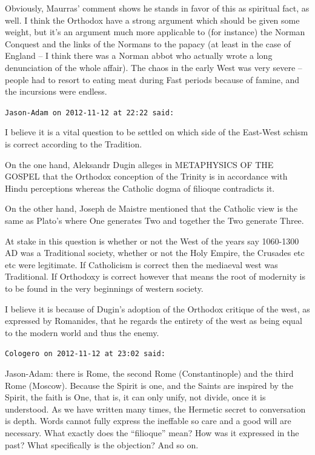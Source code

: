 \begin{footnotesize}
\begin{sffamily}
Obviously, Maurras' comment shows he stands in favor of this as spiritual fact, as well. I think the Orthodox have a strong argument which should be given some weight, but it's an argument much more applicable to (for instance) the Norman Conquest and the links of the Normans to the papacy (at least in the case of England -- I think there was a Norman abbot who actually wrote a long denunciation of the whole affair). The chaos in the early West was very severe -- people had to resort to eating meat during Fast periods because of famine, and the incursions were endless.

\hfill

\texttt{Jason-Adam on 2012-11-12 at 22:22 said:}

I believe it is a vital question to be settled on which side of the East-West schism is correct according to the Tradition.

On the one hand, Aleksandr Dugin alleges in METAPHYSICS OF THE GOSPEL that the Orthodox conception of the Trinity is in accordance with Hindu perceptions whereas the Catholic dogma of filioque contradicts it.

On the other hand, Joseph de Maistre mentioned that the Catholic view is the same as Plato's where One generates Two and together the Two generate Three.

At stake in this question is whether or not the West of the years say 1060-1300 AD was a Traditional society, whether or not the Holy Empire, the Crusades etc etc were legitimate. If Catholicism is correct then the mediaeval west was Traditional. If Orthodoxy is correct however that means the root of modernity is to be found in the very beginnings of western society.

I believe it is because of Dugin's adoption of the Orthodox critique of the west, as expressed by Romanides, that he regards the entirety of the west as being equal to the modern world and thus the enemy.

\hfill

\texttt{Cologero on 2012-11-12 at 23:02 said:}

Jason-Adam: there is Rome, the second Rome (Constantinople) and the third Rome (Moscow). Because the Spirit is one, and the Saints are inspired by the Spirit, the faith is One, that is, it can only unify, not divide, once it is understood. As we have written many times, the Hermetic secret to conversation is depth. Words cannot fully express the ineffable so care and a good will are necessary. What exactly does the ``filioque'' mean? How was it expressed in the past? What specifically is the objection? And so on.


\end{sffamily}
\end{footnotesize}
